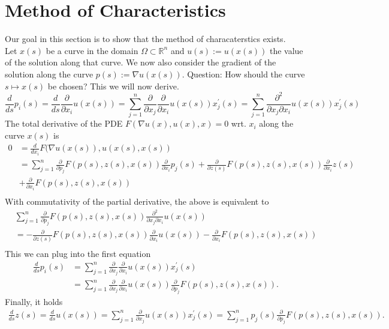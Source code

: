 \documentclass[A4,12pt,twoside]{book}
\begin{document}
\section{Method of Characteristics}

Our goal in this section is to show that the method of characaterstics exists.\\
Let $x(s)$ be a curve in the domain $\Omega \subset \mathbb{R}^n$ and $u(s):= u(x(s))$ the value of the solution along that curve. We now also consider the gradient of the solution along the curve $p(s):= \nabla u(x(s))$. Question: How should the curve $s \mapsto x(s)$ be chosen? This we will now derive.
\[
\frac{d}{ds} p_i (s) = \frac{d}{ds} \frac{\partial}{\partial x_i} u(x(s)) = \sum_{j=1}^n \frac{\partial}{\partial x_j} \frac{\partial}{\partial x_i} u(x(s)) x^\prime_j (s)=\sum_{j=1}^n \frac{\partial^2}{\partial x_j \partial x_i} u(x(s)) x^\prime_j (s)
\]
The total derivative of the PDE $F(\nabla u(x), u(x),x)=0$ wrt. $x_i$ along the curve $x(s)$ is 
\begin{align*}
    0& = \frac{d}{dx_i} F(\nabla u(x(s)),u(x(s),x(s))\\
    &=\sum_{j=1}^n \frac{\partial}{\partial p_j} F(p(s),z(s),x(s)) \frac{\partial}{\partial x_i} p_j (s) + \frac{\partial}{\partial z(s)} F(p(s),z(s),x(s)) \frac{\partial}{\partial x_i} z(s) \\
    &+ \frac{\partial}{\partial x_i} F(p(s),z(s),x(s)) \\
\end{align*}
With commutativity of the partial derivative, the above is equivalent to 
\begin{align*}
     &\sum_{j=1}^n \frac{\partial}{\partial p_j} F(p(s),z(s),x(s)) \frac{\partial^2}{\partial x_j \partial x_i} u(x(s)) \\
    &=- \frac{\partial}{\partial z(s)} F(p(s),z(s),x(s)) \frac{\partial}{\partial x_i} u(x(s)) - \frac{\partial}{\partial x_i} F(p(s),z(s),x(s)) \\
\end{align*}
This we can plug into the first equation 
\begin{align*}
    \frac{d}{ds} p_i (s) &= \sum_{j=1}^n \frac{\partial}{\partial x_j} \frac{\partial}{\partial x_i} u(x(s)) x^\prime_j (s)\\
    &= \sum_{j=1}^n \frac{\partial}{\partial x_j} \frac{\partial}{\partial x_i} u(x(s)) \frac{\partial}{\partial p_j} F(p(s),z(s),x(s)).
\end{align*}
Finally, it holds 
\begin{align*}
    \frac{d}{ds} z(s) = \frac{d}{ds} u(x(s)) = \sum_{j=1}^n \frac{\partial}{\partial x_j} u(x(s)) x^\prime_j(s) = \sum_{j=1}^n p_j (s) \frac{\partial}{\partial p_j} F(p(s),z(s),x(s)).
\end{align*}
\end{document}
